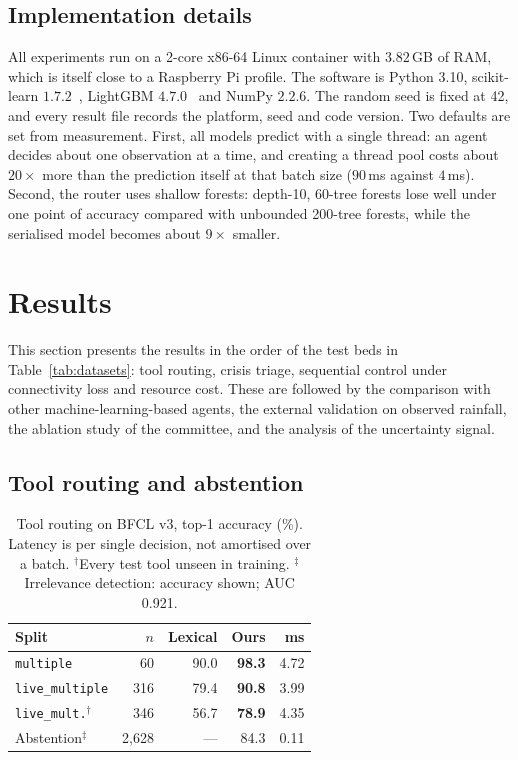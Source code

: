 \documentclass[journal]{IEEEtran}
\begin{document}
\subsection{Implementation details}\label{sec:impl}
All experiments run on a 2-core x86-64 Linux container with $3.82$\,GB of RAM,
which is itself close to a Raspberry Pi profile. The software is Python 3.10,
scikit-learn $1.7.2$~\cite{pedregosa2011sklearn}, LightGBM
$4.7.0$~\cite{ke2017lightgbm} and NumPy $2.2.6$. The random seed is fixed at 42,
and every result file records the platform, seed and code version. Two
defaults are set from measurement. First, all models predict with a single
thread: an agent decides about one observation at a time, and creating a
thread pool costs about $20\times$ more than the prediction itself at that
batch size ($90$\,ms against $4$\,ms). Second, the router uses shallow
forests: depth-10, 60-tree forests lose well under one point of accuracy
compared with unbounded 200-tree forests, while the serialised model becomes
about $9\times$ smaller.

\section{Results}\label{sec:results}
This section presents the results in the order of the test beds in
Table~\ref{tab:datasets}: tool routing, crisis triage, sequential control under
connectivity loss and resource cost. These are followed by the comparison with
other machine-learning-based agents, the external validation on observed
rainfall, the ablation study of the committee, and the analysis of the
uncertainty signal.

\subsection{Tool routing and abstention}\label{sec:routing}
\begin{table}[t]
\centering
\caption{Tool routing on BFCL v3, top-1 accuracy (\%). Latency is per single
decision, not amortised over a batch. $^\dagger$Every test tool unseen in
training. $^\ddagger$Irrelevance detection: accuracy shown; AUC 0.921.}
\label{tab:routing}
\small
\begin{tabular}{@{}lrrrr@{}}
\toprule
Split & $n$ & Lexical & \textbf{Ours} & ms \\
\midrule
\texttt{multiple}                  & 60      & 90.0 & \textbf{98.3} & 4.72 \\
\texttt{live\_multiple}            & 316     & 79.4 & \textbf{90.8} & 3.99 \\
\texttt{live\_mult.}$^\dagger$     & 346     & 56.7 & \textbf{78.9} & 4.35 \\
\midrule
Abstention$^\ddagger$              & 2{,}628 & ---  & 84.3          & 0.11 \\
\bottomrule
\end{tabular}
\end{table}
\end{document}
